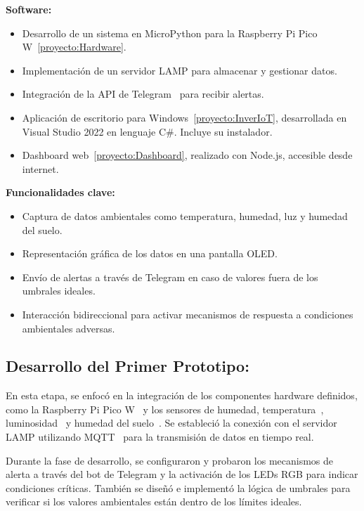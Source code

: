 \textbf{Software:}
\begin{itemize}
	\item Desarrollo de un sistema en MicroPython para la Raspberry Pi Pico W~\ref{proyecto:Hardware}.
	\item Implementación de un servidor LAMP para almacenar y gestionar datos.
	\item Integración de la API de Telegram~\cite{misc:Telegram_api} para recibir alertas.
	\item Aplicación de escritorio para Windows~\ref{proyecto:InverIoT}, desarrollada en Visual Studio 2022 en lenguaje C\#. Incluye su instalador.
	\item Dashboard web~\ref{proyecto:Dashboard}, realizado con Node.js, accesible desde internet.
\end{itemize}

\textbf{Funcionalidades clave:}
\begin{itemize}
	\item Captura de datos ambientales como temperatura, humedad, luz y humedad del suelo.
	\item Representación gráfica de los datos en una pantalla OLED.
	\item Envío de alertas a través de Telegram en caso de valores fuera de los umbrales ideales.
	\item Interacción bidireccional para activar mecanismos de respuesta a condiciones ambientales adversas.
\end{itemize}

\subsection{Desarrollo del Primer Prototipo:}
En esta etapa, se enfocó en la integración de los componentes hardware definidos, como la Raspberry Pi Pico W~\cite{misc:RPiPicoW} y los sensores de humedad, temperatura~\cite{manual:DHT22}, luminosidad~\cite{manual:BH1750} y humedad del suelo~\cite{wiki:SensorHumedadSuelo}. Se estableció la conexión con el servidor LAMP utilizando MQTT~\cite{manual:MQTT} para la transmisión de datos en tiempo real.

Durante la fase de desarrollo, se configuraron y probaron los mecanismos de alerta a través del bot de Telegram y la activación de los LEDs RGB para indicar condiciones críticas. También se diseñó e implementó la lógica de umbrales para verificar si los valores ambientales están dentro de los límites ideales.

